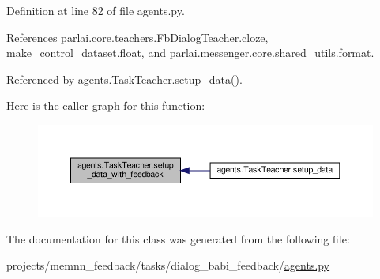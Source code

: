Definition at line 82 of file agents.\+py.



References parlai.\+core.\+teachers.\+Fb\+Dialog\+Teacher.\+cloze, make\+\_\+control\+\_\+dataset.\+float, and parlai.\+messenger.\+core.\+shared\+\_\+utils.\+format.



Referenced by agents.\+Task\+Teacher.\+setup\+\_\+data().

Here is the caller graph for this function\+:
\nopagebreak
\begin{figure}[H]
\begin{center}
\leavevmode
\includegraphics[width=350pt]{classagents_1_1TaskTeacher_a5905922070928e411cec76cda82281ec_icgraph}
\end{center}
\end{figure}


The documentation for this class was generated from the following file\+:\begin{DoxyCompactItemize}
\item 
projects/memnn\+\_\+feedback/tasks/dialog\+\_\+babi\+\_\+feedback/\hyperlink{projects_2memnn__feedback_2tasks_2dialog__babi__feedback_2agents_8py}{agents.\+py}\end{DoxyCompactItemize}
